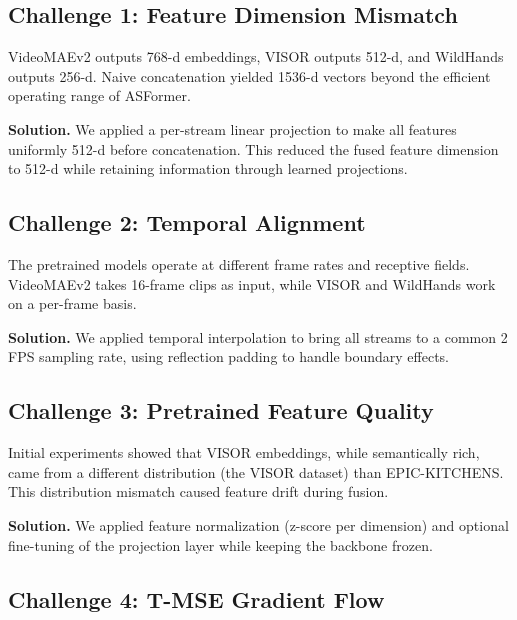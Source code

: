 \documentclass[11pt,a4paper]{article}
\begin{document}
\subsection{Challenge 1: Feature Dimension Mismatch}

VideoMAEv2 outputs 768-d embeddings, VISOR outputs 512-d, and WildHands outputs 256-d. Naive concatenation yielded 1536-d vectors beyond the efficient operating range of ASFormer.

\textbf{Solution.} We applied a per-stream linear projection to make all features uniformly 512-d before concatenation. This reduced the fused feature dimension to 512-d while retaining information through learned projections.

\subsection{Challenge 2: Temporal Alignment}

The pretrained models operate at different frame rates and receptive fields. VideoMAEv2 takes 16-frame clips as input, while VISOR and WildHands work on a per-frame basis.

\textbf{Solution.} We applied temporal interpolation to bring all streams to a common 2\,FPS sampling rate, using reflection padding to handle boundary effects.

\subsection{Challenge 3: Pretrained Feature Quality}

Initial experiments showed that VISOR embeddings, while semantically rich, came from a different distribution (the VISOR dataset) than EPIC-KITCHENS. This distribution mismatch caused feature drift during fusion.

\textbf{Solution.} We applied feature normalization (z-score per dimension) and optional fine-tuning of the projection layer while keeping the backbone frozen.

\subsection{Challenge 4: T-MSE Gradient Flow}
\end{document}
